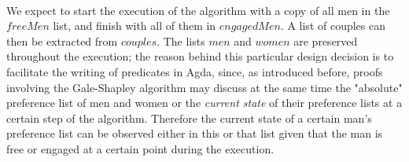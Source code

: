 {\begin{code}
\>[4]\AgdaSpace{}%
\AgdaSymbol{:}\AgdaSpace{}%
\AgdaSpace{}%
\AgdaSymbol{(}\AgdaSpace{}%
\AgdaSpace{}%
\AgdaSpace{}%
\AgdaSymbol{)}\<%
\\
%
\>[4]\AgdaSpace{}%
\AgdaSymbol{:}\AgdaSpace{}%
\AgdaSpace{}%
\AgdaSymbol{(}\AgdaSpace{}%
\AgdaSpace{}%
\AgdaSpace{}%
\AgdaSymbol{)}\<%
\\
%
\>[4]\AgdaSpace{}%
\AgdaSymbol{:}\AgdaSpace{}%
\AgdaSpace{}%
\AgdaSymbol{(}\AgdaSpace{}%
\AgdaSpace{}%
\AgdaSpace{}%
\AgdaSymbol{)}\<%
\\
%
\>[4]\AgdaSpace{}%
\AgdaSymbol{:}\AgdaSpace{}%
\AgdaSpace{}%
\AgdaSymbol{(}\AgdaSpace{}%
\AgdaSpace{}%
\AgdaSpace{}%
\AgdaSymbol{)}\<%
\\
%
\>[4]\AgdaSpace{}%
\AgdaSymbol{:}\AgdaSpace{}%
\AgdaSpace{}%
\AgdaSymbol{(}\AgdaSpace{}%
\AgdaSpace{}%
\AgdaSymbol{)}\<%
\\
%
\>[4]\AgdaSpace{}%
\AgdaSymbol{:}\AgdaSpace{}%
\<%
\\
%
\>[4]\AgdaSpace{}%
\AgdaSymbol{:}\AgdaSpace{}%
\AgdaSpace{}%
\AgdaSpace{}%
\AgdaSpace{}%
\AgdaSpace{}%
\AgdaOperator{\AgdaPrimitive{+}}\AgdaSpace{}%
\AgdaSpace{}%
\<%
\end{code}

We expect to start the execution of the algorithm with a copy of all men in the $freeMen$ list, and finish with all of them in $engagedMen$. A list of couples can then be extracted from $couples$. The lists $men$ and $women$ are preserved throughout the execution; the reason behind this particular design decision is to facilitate the writing of predicates in Agda, since, as introduced before, proofs involving the Gale-Shapley algorithm may discuss at the same time the "absolute" preference list of men and women or the \emph{current state} of their preference lists at a certain step of the algorithm. Therefore the current state of a certain man's preference list can be observed either in this or that list given that the man is free or engaged at a certain point during the execution.

}
